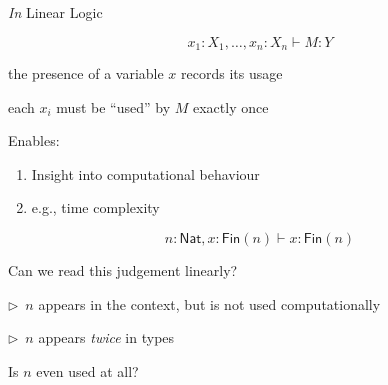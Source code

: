 \documentclass[xetex,serif,mathserif,aspectratio=169]{beamer}
\begin{document}
\begin{frame}
  \emph{In} Linear Logic

  \bigskip

  \begin{displaymath}
    x_1 : X_1, \dots, x_n : X_n \vdash M : Y
  \end{displaymath}

  \pause
  \bigskip

  \begin{center}
    the presence of a variable $x$ records its usage

    each $x_i$ must be ``used'' by $M$ exactly once
  \end{center}

  \pause
  \bigskip

  \begin{center}
    \begin{minipage}{0.6\linewidth}
      Enables:
      \begin{enumerate}
      \item Insight into computational behaviour
      \item e.g., time complexity
      \end{enumerate}
    \end{minipage}
  \end{center}
\end{frame}

\newcommand{\point}{\textcolor{titlered}{$\rhd$}~}

\begin{frame}
  \begin{displaymath}
    n : \mathsf{Nat}, x : \mathsf{Fin}(n) \vdash x : \mathsf{Fin}(n)
  \end{displaymath}

  \bigskip

  Can we read this judgement linearly?

  \pause
  \bigskip

  \point $n$ appears in the context, but is not used computationally

  \pause
  \bigskip

  \point $n$ appears \emph{twice} in types

  \pause
  \bigskip

  Is $n$ even used at all?
\end{frame}
\end{document}
